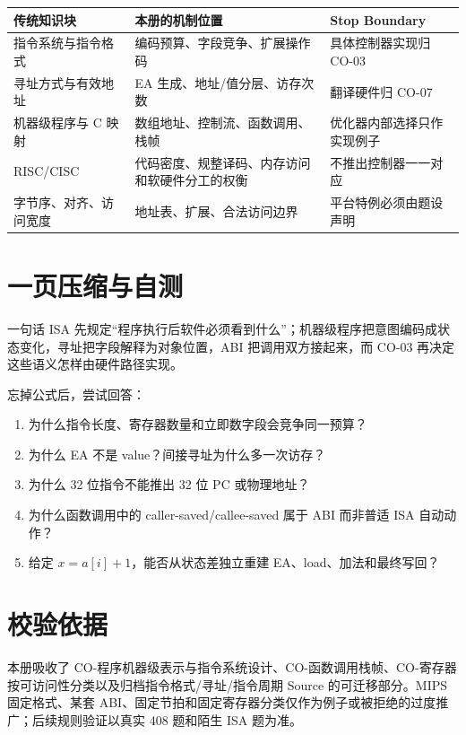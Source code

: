 \documentclass[UTF8,fontset=fandol,11pt,a4paper]{ctexart}
\begin{document}
\begin{tabularx}{\linewidth}{L{3.2cm}L{5.4cm}Y}
\toprule
传统知识块 & 本册的机制位置 & Stop Boundary\\
\midrule
指令系统与指令格式 & 编码预算、字段竞争、扩展操作码 & 具体控制器实现归 CO-03\\
寻址方式与有效地址 & EA 生成、地址/值分层、访存次数 & 翻译硬件归 CO-07\\
机器级程序与 C 映射 & 数组地址、控制流、函数调用、栈帧 & 优化器内部选择只作实现例子\\
RISC/CISC & 代码密度、规整译码、内存访问和软硬件分工的权衡 & 不推出控制器一一对应\\
字节序、对齐、访问宽度 & 地址表、扩展、合法访问边界 & 平台特例必须由题设声明\\
\bottomrule
\end{tabularx}

\section{一页压缩与自测}

\begin{corebox}{一句话}
ISA 先规定“程序执行后软件必须看到什么”；机器级程序把意图编码成状态变化，寻址把字段解释为对象位置，ABI 把调用双方接起来，而 CO-03 再决定这些语义怎样由硬件路径实现。
\end{corebox}

忘掉公式后，尝试回答：
\begin{enumerate}
  \item 为什么指令长度、寄存器数量和立即数字段会竞争同一预算？
  \item 为什么 EA 不是 value？间接寻址为什么多一次访存？
  \item 为什么 32 位指令不能推出 32 位 PC 或物理地址？
  \item 为什么函数调用中的 caller-saved/callee-saved 属于 ABI 而非普适 ISA 自动动作？
  \item 给定 $x=a[i]+1$，能否从状态差独立重建 EA、load、加法和最终写回？
\end{enumerate}

\section{校验依据}

本册吸收了 CO-程序机器级表示与指令系统设计、CO-函数调用栈帧、CO-寄存器按可访问性分类以及归档指令格式/寻址/指令周期 Source 的可迁移部分。MIPS 固定格式、某套 ABI、固定节拍和固定寄存器分类仅作为例子或被拒绝的过度推广；后续规则验证以真实 408 题和陌生 ISA 题为准。
\end{document}

